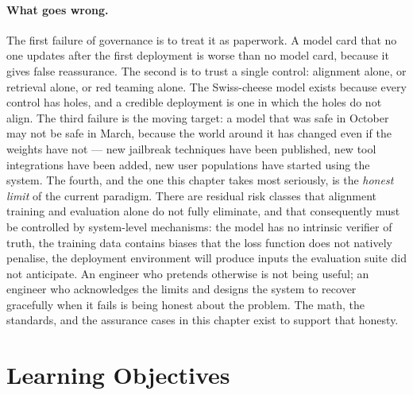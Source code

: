 \paragraph{What goes wrong.}
The first failure of governance is to treat it as paperwork. A model
card that no one updates after the first deployment is worse than no
model card, because it gives false reassurance. The second is to
trust a single control: alignment alone, or retrieval alone, or red
teaming alone. The Swiss-cheese model exists because every control
has holes, and a credible deployment is one in which the holes do
not align. The third failure is the moving target: a model that was
safe in October may not be safe in March, because the world around
it has changed even if the weights have not --- new jailbreak
techniques have been published, new tool integrations have been
added, new user populations have started using the system. The
fourth, and the one this chapter takes most seriously, is the
\emph{honest limit} of the current paradigm. There are residual
risk classes that alignment training and evaluation alone do not
fully eliminate, and that consequently must be controlled by
system-level mechanisms: the model has no intrinsic verifier of
truth, the training data contains biases that the loss function
does not natively penalise,
the deployment environment will produce inputs the evaluation suite
did not anticipate. An engineer who pretends otherwise is not being
useful; an engineer who acknowledges the limits and designs the
system to recover gracefully when it fails is being honest about the
problem. The math, the standards, and the assurance cases in this
chapter exist to support that honesty.

\section{Learning Objectives}

